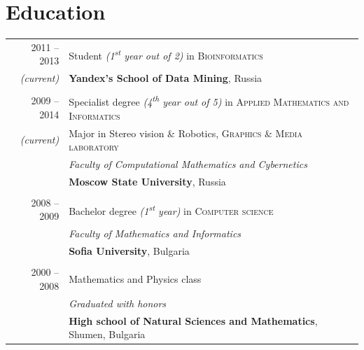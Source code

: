 \documentclass[a4paper,10pt]{article}
\def\myline{\color{linegray}\vline}
\begin{document}
\section{Education}
\hspace{0mm}\begin{tabular}{r!{\myline}p{14cm}}
	\textsc{2011 -- 2013}     &  Student {\small\textit{(1\textsuperscript{st} year out of 2)}} in \textsc{Bioinformatics}\\
	\small\textit{(current)}  &  \textbf{Yandex's School of Data Mining}, Russia\\
	
        \\
        \textsc{2009 -- 2014}     &  Specialist degree {\small\textit{(4\textsuperscript{th} year out of 5)}} in \textsc{Applied Mathematics and Informatics}\\
        \small\textit{(current)}  &  Major in Stereo vision \& Robotics, \textsc{Graphics \& Media laboratory}\\
                                  &  \textit{Faculty of Computational Mathematics and Cybernetics}\\
                                  &  \textbf{Moscow State University}, Russia\\

	\\
	\textsc{2008 -- 2009}     &  Bachelor degree {\small\textit{(1\textsuperscript{st} year)}} in \textsc{Computer science}\\
                                  &  \textit{Faculty of Mathematics and Informatics}\\
                                  &  \textbf{Sofia University}, Bulgaria\\
	
	\\
	\textsc{2000 -- 2008}     &  Mathematics and Physics class\\
                                  &  \textit{Graduated with honors}\\ %
                                  &  \textbf{High school of Natural Sciences and Mathematics}, Shumen, Bulgaria\\
\end{tabular}
\par\smallskip
\end{document}
